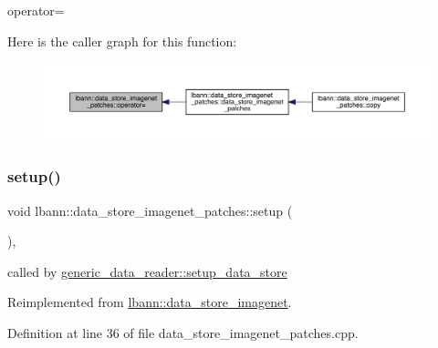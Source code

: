 operator= 

Here is the caller graph for this function\+:\nopagebreak
\begin{figure}[H]
\begin{center}
\leavevmode
\includegraphics[width=350pt]{classlbann_1_1data__store__imagenet__patches_a0a2e0ecbd10a65b02019ce9e816f88dd_icgraph}
\end{center}
\end{figure}
\mbox{\label{classlbann_1_1data__store__imagenet__patches_aa8cfaf12c87f3dbbbb4fc808f6ca26ad}} 
\subsubsection{\texorpdfstring{setup()}{setup()}}
{\footnotesize\ttfamily void lbann\+::data\+\_\+store\+\_\+imagenet\+\_\+patches\+::setup (\begin{DoxyParamCaption}{ }\end{DoxyParamCaption})\hspace{0.3cm}{\ttfamily [override]}, {\ttfamily [virtual]}}



called by \hyperlink{classlbann_1_1generic__data__reader_a8b2a09d38512fc11f1b9d572c89100a7}{generic\+\_\+data\+\_\+reader\+::setup\+\_\+data\+\_\+store} 



Reimplemented from \hyperlink{classlbann_1_1data__store__imagenet_a611aa1734a491c443396a077b49fe4fe}{lbann\+::data\+\_\+store\+\_\+imagenet}.



Definition at line 36 of file data\+\_\+store\+\_\+imagenet\+\_\+patches.\+cpp.


